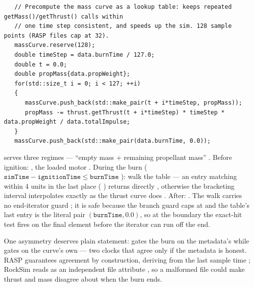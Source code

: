 \begin{listing}[htbp]
\begin{verbatim}
   // Precompute the mass curve as a lookup table: keeps repeated getMass()/getThrust() calls within
   // one time step consistent, and speeds up the sim. 128 sample points (RASP files cap at 32).
   massCurve.reserve(128);
   double timeStep = data.burnTime / 127.0;
   double t = 0.0;
   double propMass{data.propWeight};
   for(std::size_t i = 0; i < 127; ++i)
   {
      massCurve.push_back(std::make_pair(t + i*timeStep, propMass));
      propMass -= thrust.getThrust(t + i*timeStep) * timeStep * data.propWeight / data.totalImpulse;
   }
   massCurve.push_back(std::make_pair(data.burnTime, 0.0));
\end{verbatim}
\caption{The 128-point depletion table : a left Riemann
sum of the constant-$I_{sp}$ law with the final point pinned to exact depletion. Note
what is absent --- the vector is reserved but never cleared.}\label{lst:motors-masscurve}
\end{listing}

 serves three regimes --- ``empty mass + remaining propellant
mass'' . Before ignition: , the loaded
motor . During the burn
($\mathtt{simTime}-\mathtt{ignitionTime}\le\mathtt{burnTime}$
): walk the table --- an entry matching within 4 units in
the last place (
) returns directly
, otherwise the bracketing interval interpolates exactly as
the thrust curve does . After: 
. The walk carries no end-iterator guard
; it is safe because the branch guard caps
 at  and the table's last entry is the literal pair
$(\mathtt{burnTime}, 0.0)$, so at the boundary the exact-hit test fires on the final
element before the iterator can run off the end.

One asymmetry deserves plain statement:  gates the burn on the metadata's
 while  gates on the curve's own 
  --- two clocks that agree
only if the metadata is honest. RASP guarantees agreement by construction, deriving
 from the last sample time ; RockSim reads
 as an independent file attribute ,
so a malformed file could make thrust and mass disagree about when the burn ends.

